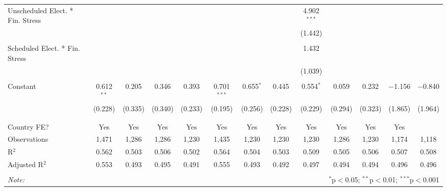\begin{table}[!htbp]
\begin{tabular}{@{\extracolsep{5pt}}lcccccccccccc}
 Unscheduled Elect. * Fin. Stress &  &  &  &  &  &  &  & 4.902$^{***}$ &  &  &  &  \\ 
  &  &  &  &  &  &  &  & (1.442) &  &  &  &  \\ 
  & & & & & & & & & & & & \\ 
 Scheduled Elect. * Fin. Stress &  &  &  &  &  &  &  & 1.432 &  &  &  &  \\ 
  &  &  &  &  &  &  &  & (1.039) &  &  &  &  \\ 
  & & & & & & & & & & & & \\ 
 Constant & 0.612$^{**}$ & 0.205 & 0.346 & 0.393 & 0.701$^{***}$ & 0.655$^{*}$ & 0.445 & 0.554$^{*}$ & 0.059 & 0.232 & $-$1.156 & $-$0.840 \\ 
  & (0.228) & (0.335) & (0.340) & (0.233) & (0.195) & (0.256) & (0.228) & (0.229) & (0.294) & (0.323) & (1.865) & (1.964) \\ 
  & & & & & & & & & & & & \\ 
\hline \\[-1.8ex] 
Country FE? & Yes & Yes & Yes & Yes & Yes & Yes & Yes & Yes & Yes & Yes & Yes &  \\ 
Observations & 1,471 & 1,286 & 1,286 & 1,230 & 1,435 & 1,230 & 1,230 & 1,230 & 1,286 & 1,230 & 1,174 & 1,118 \\ 
R$^{2}$ & 0.562 & 0.503 & 0.506 & 0.502 & 0.564 & 0.504 & 0.503 & 0.509 & 0.505 & 0.506 & 0.507 & 0.508 \\ 
Adjusted R$^{2}$ & 0.553 & 0.493 & 0.495 & 0.491 & 0.555 & 0.493 & 0.492 & 0.497 & 0.494 & 0.494 & 0.496 & 0.496 \\ 
\hline 
\hline \\[-1.8ex] 
\textit{Note:}  & \multicolumn{12}{r}{$^{*}$p$<$0.05; $^{**}$p$<$0.01; $^{***}$p$<$0.001} \\ 
\end{tabular} 
\end{table} 
